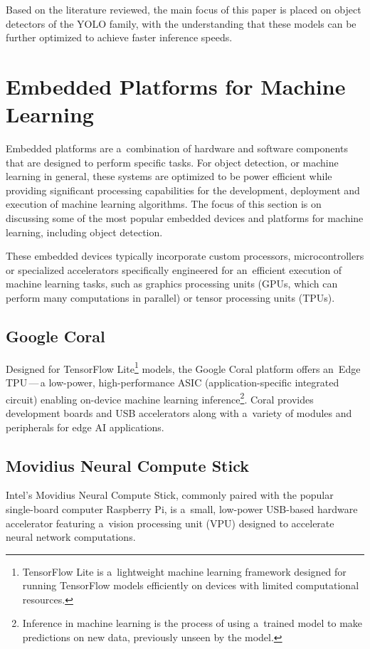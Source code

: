 Based on the literature reviewed, the main focus of this paper is placed on
object detectors of the YOLO family, with the understanding that these models
can be further optimized to achieve faster inference speeds.


\section{Embedded Platforms for Machine Learning}
\label{EmbeddedPlatforms}

Embedded platforms are a~combination of hardware and software components that
are designed to perform specific tasks. For object detection, or machine
learning in general, these systems are optimized to be power efficient while
providing significant processing capabilities for the development, deployment
and execution of machine learning algorithms. The focus of this section is on
discussing some of the most popular embedded devices and platforms for machine
learning, including object detection.

These embedded devices typically incorporate custom processors, microcontrollers
or specialized accelerators specifically engineered for an~efficient execution of
machine learning tasks, such as graphics processing units (GPUs, which can
perform many computations in parallel) or tensor processing units (TPUs).


\subsection{Google Coral}

Designed for TensorFlow Lite\footnote{TensorFlow Lite is a~lightweight machine
learning framework designed for running TensorFlow models efficiently on devices
with limited computational resources.} models, the Google Coral platform offers
an~Edge TPU\,---\,a low-power, high-performance ASIC (application-specific
integrated circuit) enabling on-device machine learning
inference\footnote{Inference in machine learning is the process of using
a~trained model to make predictions on new data, previously unseen by the model.}.
Coral provides development boards and USB accelerators along with a~variety of
modules and peripherals for edge AI applications.


\subsection{Movidius Neural Compute Stick}

Intel's Movidius Neural Compute Stick, commonly paired with the popular
single-board computer Raspberry Pi, is a~small, low-power USB-based hardware
accelerator featuring a~vision processing unit (VPU) designed to accelerate
neural network computations.


